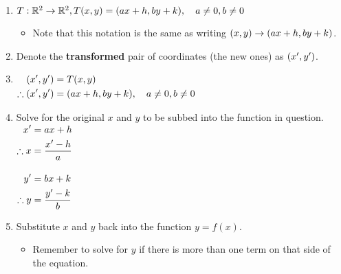 \documentclass[12pt,a4paper,titlepage]{article}
\DeclarePairedDelimiter {\pars}  {  (      }     {  )      }
\begin{document}
\begin{SummaryBox}[title=Transformations, breakable]
                \begin{SummaryExtensionBox}[title=Applying transformations]
                    \begin{enumerate}[leftmargin=*]
                        \item $T:\mathbb{R}^2 \to \mathbb{R}^2, T\pars*{x,y} = \pars*{ax+h, by+k},\quad a \neq 0, b \neq 0 $
                        \begin{itemize}[topsep=0pt]
                            \item Note that this notation is the same as writing $\pars*{x,y} \to \pars*{ax+h, by+k}$.
                        \end{itemize}
                        \item Denote the \textbf{transformed} pair of coordinates (the new ones) as $\pars*{x', y'}$.
                        \item $\begin{aligned}[t]
                                  \pars*{x', y'} &= T\pars*{x,y} \\
                                  \therefore \pars*{x', y'} &= \pars*{ax+h, by+k},\quad a \neq 0, b \neq 0
                               \end{aligned}$
                        \item Solve for the original $x$ and $y$ to be subbed into the function in question.\\
                        $\begin{aligned}[t]
                            x' &= ax + h \\
                            \therefore x &= \frac{x' - h}{a} \\[\belowdisplayskip]
                            y' &= bx + k \\
                            \therefore y &= \frac{y' - k}{b}
                         \end{aligned}$
                         \item Substitute $x$ and $y$ back into the function $y=f(x)$.
                         \begin{itemize}[topsep=0pt]
                             \item Remember to solve for $y$ if there is more than one term on that side of the equation.
                         \end{itemize}
                    \end{enumerate}
                \end{SummaryExtensionBox}
            \end{SummaryBox}
            
\end{document}
